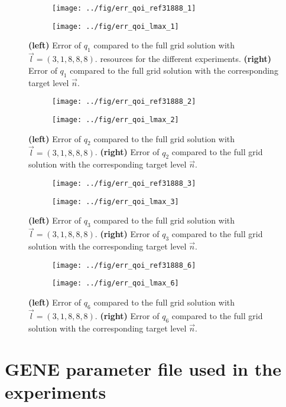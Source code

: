 \documentclass{scrartcl}
\begin{document}
\begin{figure}[h]
    \begin{subfigure}{0.5\textwidth}
        \texttt{[image: ../fig/err\_qoi\_ref31888\_1]}
    \end{subfigure}%
    \begin{subfigure}{0.5\textwidth}
        \texttt{[image: ../fig/err\_qoi\_lmax\_1]}
    \end{subfigure}%
    \caption{\textbf{(left)} Error of $q_1$ compared to the full grid solution with $\vec{l} = (3,1,8,8,8)$. resources for the different experiments. \textbf{(right)} Error of $q_1$ compared to the full grid solution with the corresponding target level $\vec{n}$. }
    \label{fig:q1}
\end{figure}

\begin{figure}[h]
    \begin{subfigure}{0.5\textwidth}
        \texttt{[image: ../fig/err\_qoi\_ref31888\_2]}
    \end{subfigure}%
    \begin{subfigure}{0.5\textwidth}
        \texttt{[image: ../fig/err\_qoi\_lmax\_2]}
    \end{subfigure}%
    \caption{\textbf{(left)} Error of $q_2$ compared to the full grid solution with $\vec{l} = (3,1,8,8,8)$. \textbf{(right)} Error of $q_2$ compared to the full grid solution with the corresponding target level $\vec{n}$. }
    \label{fig:q2}
\end{figure}

\begin{figure}[h]
    \begin{subfigure}{0.5\textwidth}
        \texttt{[image: ../fig/err\_qoi\_ref31888\_3]}
    \end{subfigure}%
    \begin{subfigure}{0.5\textwidth}
        \texttt{[image: ../fig/err\_qoi\_lmax\_3]}
    \end{subfigure}%
    \caption{\textbf{(left)} Error of $q_3$ compared to the full grid solution with $\vec{l} = (3,1,8,8,8)$. \textbf{(right)} Error of $q_3$ compared to the full grid solution with the corresponding target level $\vec{n}$. }
    \label{fig:q3}
\end{figure}

\begin{figure}[h]
    \begin{subfigure}{0.5\textwidth}
        \texttt{[image: ../fig/err\_qoi\_ref31888\_6]}
    \end{subfigure}%
    \begin{subfigure}{0.5\textwidth}
        \texttt{[image: ../fig/err\_qoi\_lmax\_6]}
    \end{subfigure}%
    \caption{\textbf{(left)} Error of $q_6$ compared to the full grid solution with $\vec{l} = (3,1,8,8,8)$. \textbf{(right)} Error of $q_6$ compared to the full grid solution with the corresponding target level $\vec{n}$. }
    \label{fig:q6}
\end{figure}



\clearpage
\appendix
\section{GENE parameter file used in the experiments}

\end{document}
